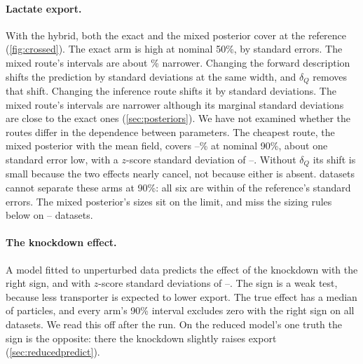 \paragraph{Lactate export.} With the hybrid, both the exact and the mixed posterior
cover at the reference (\cref{fig:crossed}). The exact arm is high at nominal 50\%, by
 standard errors. The mixed route's intervals are about
\% narrower. Changing the forward description shifts the
prediction by  standard deviations at the same width, and $\delta_Q$
removes that shift. Changing the inference route shifts it by 
standard deviations. The mixed route's intervals are narrower although its marginal
standard deviations are close to the exact ones (\cref{sec:posteriors}). We have not
examined whether the routes differ in the dependence between parameters. The cheapest
route, the mixed posterior with the mean field, covers
--\% at nominal 90\%, about one standard error
low, with a $z$-score standard deviation of --. Without
$\delta_Q$ its shift is small because the two effects nearly cancel, not because
either is absent.  datasets cannot separate these arms at 90\%: all six
are within  of the reference's standard errors. The mixed posterior's
sizes sit on the limit, and miss the sizing rules below on
-- datasets.

\paragraph{The knockdown effect.} A model fitted to unperturbed data predicts the
effect of the knockdown with the right sign, and with $z$-score standard deviations of
--. The sign is a weak test, because less transporter is
expected to lower export. The true effect has a median of  particles,
and every arm's 90\% interval excludes zero with the right sign on all 
datasets. We read this off after the run. On the reduced model's one truth the sign is the
opposite: there the knockdown slightly raises export (\cref{sec:reducedpredict}).

